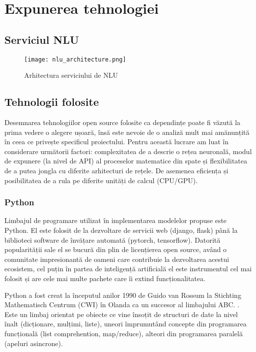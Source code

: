 \chapter{Expunerea tehnologiei}

\section{Serviciul NLU}
\begin{figure}[h]
	\texttt{[image: nlu\_architecture.png]}
	\caption{Arhitectura serviciului de NLU}
	\label{fig:nlu_arch}
\end{figure}

\section{Tehnologii folosite}

Desemnarea tehnologiilor open source folosite ca dependințe poate fi văzută la prima vedere o alegere ușoară, însă este nevoie de o analiză mult mai amănunțită în ceea ce privește specificul proiectului.
Pentru această lucrare am luat în considerare următorii factori: complexitatea de a descrie o rețea neuronală, modul de expunere (la nivel de API) al proceselor matematice din spate și flexibilitatea de a putea jongla cu diferite arhitecturi de rețele. De asemenea eficiența și posibilitatea de a rula pe diferite unități de calcul (CPU/GPU).

\subsection{Python}

Limbajul de programare utilizat în implementarea modelelor propuse este Python. El este folosit de la dezvoltare de servicii web (django, flask) până la biblioteci software de învățare automată (pytorch, tensorflow). Datorită popularității sale el se bucură din plin de licențierea open source, având o comunitate impresionantă de oameni care contribuie la dezvoltarea acestui ecosistem, cel puțin în partea de inteligență artificială el este instrumentul cel mai folosit și are cele mai multe pachete care îi extind funcționalitatea. 

Python a fost creat la începutul anilor 1990 de Guido van Rossum la Stichting Mathematisch Centrum (CWI) în Olanda ca un succesor al limbajului ABC. \cite{pythonhistory}. Este un limbaj orientat pe obiecte ce vine însoțit de structuri de date la nivel înalt (dicționare, mulțimi, liste), uneori împrumutând concepte din programarea funcțională (list comprehention, map/reduce), alteori din programarea paralelă (apeluri asincrone).

